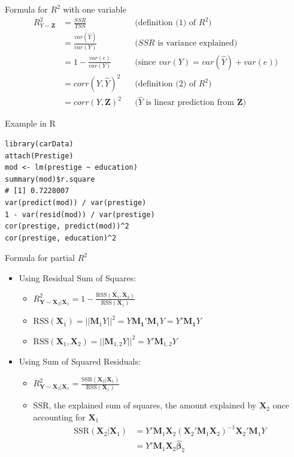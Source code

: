 \documentclass[aspectratio=169, handout, t]{beamer}
\numberwithin{equation}{section}
\begin{document}
\begin{frame}{Formula for $R^2$ with one variable}
\begin{align*}
R^2_{Y\sim \bm{Z}} &= \frac{SSR}{TSS} &&\text{(definition (1) of $R^2$)}\\[10pt]
&= \frac{var(\hat{Y})}{var(Y)} &&\text{($SSR$ is variance explained)}\\[10pt]
&= 1 - \frac{var(e)}{var(Y)} &&\text{(since $var(Y)=var(\hat{Y})+var(e)$)}\\[10pt]
&= corr(Y, \hat{Y})^2 &&\text{(definition (2) of $R^2$)}\\[10pt]
&= corr(Y, \bm{Z})^2 &&\text{($\hat{Y}$ is linear prediction from $\bm{Z}$)}
\end{align*}

\end{frame}


\begin{frame}[fragile]{Example in R}
\begin{lstlisting}
library(carData)
attach(Prestige)
mod <- lm(prestige ~ education)
summary(mod)$r.square
# [1] 0.7228007
var(predict(mod)) / var(prestige) 
1 - var(resid(mod)) / var(prestige) 
cor(prestige, predict(mod))^2
cor(prestige, education)^2
\end{lstlisting}

\end{frame}


\begin{frame}{Formula for partial $R^2$}
\begin{itemize}
\item Using Residual Sum of Squares:
\begin{itemize}
\item $R^2_{\bm{Y}\sim \bm{X}_2|\bm{X}_1}=1-\frac{\text{RSS}(\bm{X}_1,\bm{X}_2)}{\text{RSS}(\bm{X}_1)}$
\item $\text{RSS}(\bm{X}_1)=||\bm{M}_1Y||^2=Y\bm{M_1}'\bm{M}_1Y=Y'\bm{M_1}Y$
\item $\text{RSS}(\bm{X}_{1},\bm{X}_2)=||\bm{M}_{1,2}Y||^2=Y'\bm{M}_{1,2}Y$
\end{itemize}\pause
\item Using Sum of Squared Residuals:
\begin{itemize}
\item $R^2_{\bm{Y}\sim \bm{X}_2|\bm{X}_1}=\frac{\text{SSR}(\bm{X}_2|\bm{X}_1)}{\text{RSS}(\bm{X}_1)}$
\item SSR, the explained sum of squares, the amount explained by $\bm{X}_2$ once accounting for $\bm{X}_1$
\begin{align*}
\text{SSR}(\bm{X}_2|\bm{X}_1)&=Y'\bm{M}_1\bm{X}_2(\bm{X}_2'\bm{M}_1\bm{X}_2)^{-1}\bm{X}_2'\bm{M}_1Y\\
&=Y'\bm{M}_1\bm{X}_2\bm{\hat{\beta}}_2
\end{align*}
\end{itemize}
\end{itemize}
\end{frame}
\end{document}
